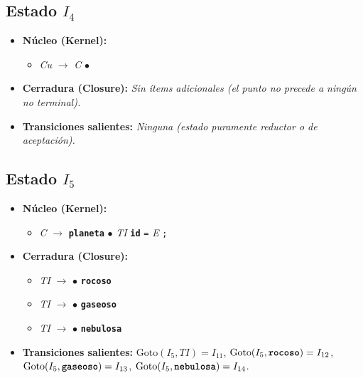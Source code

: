 \documentclass[12pt, letterpaper]{article}
\begin{document}
\subsection*{Estado $I_{4}$ }
\begin{itemize}\setlength{\itemsep}{1pt}\setlength{\parskip}{0pt}
\item \textbf{Núcleo (Kernel):}
\begin{itemize}\setlength{\itemsep}{1pt}\setlength{\parskip}{0pt}
    \item \textit{Cu} $\to$ \textit{C} $\bullet$ 
\end{itemize}
\item \textbf{Cerradura (Closure):} \emph{Sin ítems adicionales (el punto no precede a ningún no terminal).}
\item \textbf{Transiciones salientes:} \emph{Ninguna (estado puramente reductor o de aceptación).}
\end{itemize}
\vspace{2pt}
\subsection*{Estado $I_{5}$ }
\begin{itemize}\setlength{\itemsep}{1pt}\setlength{\parskip}{0pt}
\item \textbf{Núcleo (Kernel):}
\begin{itemize}\setlength{\itemsep}{1pt}\setlength{\parskip}{0pt}
    \item \textit{C} $\to$ \textbf{\texttt{planeta}} $\bullet$ \textit{TI} \textbf{\texttt{id}} \texttt{=} \textit{E} \texttt{;}
\end{itemize}
\item \textbf{Cerradura (Closure):}
\begin{itemize}\setlength{\itemsep}{1pt}\setlength{\parskip}{0pt}
    \item \textit{TI} $\to$ $\bullet$ \textbf{\texttt{rocoso}}
    \item \textit{TI} $\to$ $\bullet$ \textbf{\texttt{gaseoso}}
    \item \textit{TI} $\to$ $\bullet$ \textbf{\texttt{nebulosa}}
\end{itemize}
\item \textbf{Transiciones salientes:} $\text{Goto}(I_{5}, \textit{TI}) = I_{11}$, \quad $\text{Goto}(I_{5}, \textbf{\texttt{rocoso}}) = I_{12}$, \quad $\text{Goto}(I_{5}, \textbf{\texttt{gaseoso}}) = I_{13}$, \quad $\text{Goto}(I_{5}, \textbf{\texttt{nebulosa}}) = I_{14}$.
\end{itemize}
\vspace{2pt}
\end{document}
